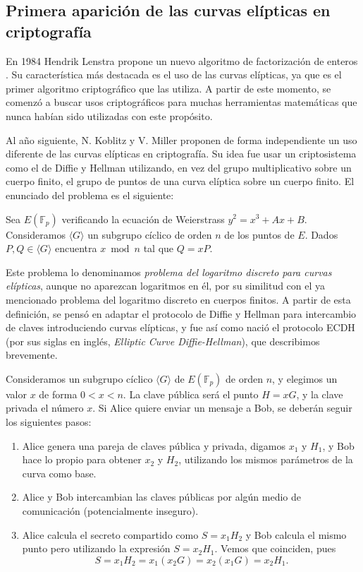 \documentclass[
  a4paper,
  12pt,
  spanish,
]{scrartcl}
\begin{document}
\subsection{Primera aparición de las curvas elípticas en criptografía}

En 1984 Hendrik Lenstra propone un nuevo algoritmo de factorización de enteros \parencite{lenstra_divisors_1984}. Su característica más destacada es el uso de las curvas elípticas, ya que es el primer algoritmo criptográfico que las utiliza. A partir de este momento, se comenzó a buscar usos criptográficos para muchas herramientas matemáticas que nunca habían sido utilizadas con este propósito.

Al año siguiente, N. Koblitz \parencite{koblitz_elliptic_1987} y V. Miller \parencite{williams_use_1986} proponen de forma independiente un uso diferente de las curvas elípticas en criptografía. Su idea fue usar un criptosistema como el de Diffie y Hellman utilizando, en vez del grupo multiplicativo sobre un cuerpo finito, el grupo de puntos de una curva elíptica sobre un cuerpo finito. El enunciado del problema es el siguiente:
\begin{displayquote}
  Sea $E(\mathbb{F}_p)$ verificando la ecuación de Weierstrass $y^2 =x^3 + Ax + B$. Consideramos $\langle G \rangle$ un subgrupo cíclico de orden $n$ de los puntos de $E$. Dados $P,Q \in \langle G \rangle$ encuentra $x \bmod{n}$ tal que $Q=xP$.
\end{displayquote}

Este problema lo denominamos \textit{problema del logaritmo discreto para curvas elípticas}, aunque no aparezcan logaritmos en él, por su similitud con el ya mencionado problema del logaritmo discreto en cuerpos finitos. A partir de esta definición, se pensó en adaptar el protocolo de Diffie y Hellman para intercambio de claves introduciendo curvas elípticas, y fue así como nació el protocolo ECDH (por sus siglas en inglés, \textit{Elliptic Curve Diffie-Hellman}), que describimos brevemente.

    Consideramos un subgrupo cíclico $\langle G \rangle$ de $E(\mathbb{F}_p)$ de orden $n$, y elegimos un valor \(x\) de forma $0 < x < n$. La clave pública será el punto $H = xG$, y la clave privada el número $x$. Si Alice quiere enviar un mensaje a Bob, se deberán seguir los siguientes pasos:

    \begin{enumerate}
	\item Alice genera una pareja de claves pública y privada, digamos $x_1$ y $H_1$, y Bob hace lo propio para obtener $x_2$ y $H_2$, utilizando los mismos parámetros de la curva como base.
	\item Alice y Bob intercambian las claves públicas por algún medio de comunicación (potencialmente inseguro).
	\item Alice calcula el secreto compartido como $S = x_1H_2$ y Bob calcula el mismo punto pero utilizando la expresión $S = x_2H_1$. Vemos que coinciden, pues \[ S = x_1H_2 = x_1(x_2G) = x_2(x_1G) = x_2H_1. \]
\end{enumerate}
\end{document}
